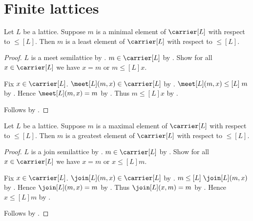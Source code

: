 \section{Finite lattices}






\begin{proposition}\label{lattice_minimal_element_is_least}
    Let $L$ be a lattice.
    Suppose $m$ is a minimal element of $\carrier[L]$ with respect to
        $\leq[L]$.
    Then $m$ is a least element of $\carrier[L]$ with respect to $\leq[L]$.
\end{proposition}
\begin{proof}
    $L$ is a meet semilattice by .
    $m\in\carrier[L]$ by .
    Show for all $x\in\carrier[L]$ we have
        $x=m$ or $m\mathrel{\leq[L]}x$.
    \begin{subproof}
        Fix $x\in\carrier[L]$.
        $\meet[L](m,x)\in\carrier[L]$ by .
        $\meet[L](m,x)\mathrel{\leq[L]}m$ by .
        Hence $\meet[L](m,x)=m$ by .
        Thus $m\mathrel{\leq[L]}x$ by .
    \end{subproof}
    Follows by .
\end{proof}

\begin{proposition}\label{lattice_maximal_element_is_greatest}
    Let $L$ be a lattice.
    Suppose $m$ is a maximal element of $\carrier[L]$ with respect to
        $\leq[L]$.
    Then $m$ is a greatest element of $\carrier[L]$ with respect to $\leq[L]$.
\end{proposition}
\begin{proof}
    $L$ is a join semilattice by .
    $m\in\carrier[L]$ by .
    Show for all $x\in\carrier[L]$ we have
        $x=m$ or $x\mathrel{\leq[L]}m$.
    \begin{subproof}
        Fix $x\in\carrier[L]$.
        $\join[L](m,x)\in\carrier[L]$ by .
        $m\mathrel{\leq[L]}\join[L](m,x)$ by .
        Hence $\join[L](m,x)=m$ by .
        Thus $\join[L](x,m)=m$ by .
        Hence $x\mathrel{\leq[L]}m$ by .
    \end{subproof}
    Follows by .
\end{proof}

